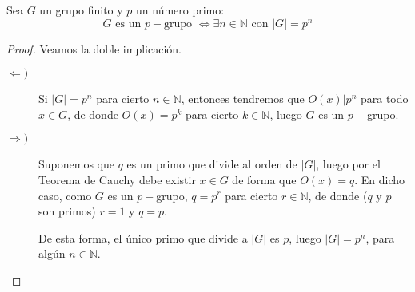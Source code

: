 \begin{coro}\label{coro:orden_pgrupo}
    Sea $G$ un grupo finito y $p$ un número primo:
    \begin{equation*}
        G \text{\ es un $p-$grupo\ } \Longleftrightarrow \exists n\in \mathbb{N} \text{\ con\ } |G| = p^n
    \end{equation*}
    \begin{proof}
        Veamos la doble implicación.
        \begin{description}
            \item [$\Longleftarrow)$] Si $|G| = p^n$ para cierto $n\in \mathbb{N}$, entonces tendremos que $O(x) | p^n$ para todo $x\in G$, de donde $O(x) = p^k$ para cierto $k\in \mathbb{N}$, luego $G$ es un $p-$grupo.
            \item [$\Longrightarrow)$] Suponemos que $q$ es un primo que divide al orden de $|G|$, luego por el Teorema de Cauchy debe existir $x\in G$ de forma que $O(x) = q$. En dicho caso, como $G$ es un $p-$grupo, $q = p^r$ para cierto $r\in \mathbb{N}$, de donde ($q$ y $p$ son primos) $r = 1$ y $q = p$.

                De esta forma, el único primo que divide a $|G|$ es $p$, luego $|G| = p^n$, para algún $n\in \mathbb{N}$. \qedhere
        \end{description}
    \end{proof}
\end{coro}

